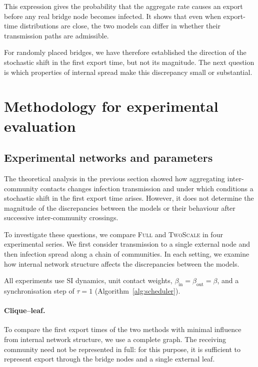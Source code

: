 \documentclass[a4paper,fleqn]{cas-sc}
\newcommand{\Full}{\textup{\textsc{Full}}}
\newcommand{\TS}{\textup{\textsc{TwoScale}}}
\begin{document}
This expression gives the probability that the aggregate rate causes an export before any real bridge node becomes infected. It shows that even when export-time distributions are close, the two models can differ in whether their transmission paths are admissible.

For randomly placed bridges, we have therefore established the direction of the stochastic shift in the first export time, but not its magnitude. The next question is which properties of internal spread make this discrepancy small or substantial.


\section{Methodology for experimental evaluation}
\label{sec:design}

\subsection{Experimental networks and parameters}

The theoretical analysis in the previous section showed how aggregating inter-community contacts changes infection transmission and under which conditions a stochastic shift in the first export time arises. However, it does not determine the magnitude of the discrepancies between the models or their behaviour after successive inter-community crossings.

To investigate these questions, we compare \Full{} and \TS{} in four experimental series. We first consider transmission to a single external node and then infection spread along a chain of communities. In each setting, we examine how internal network structure affects the discrepancies between the models.

All experiments use SI dynamics, unit contact weights, $\beta_{\mathrm{in}}=\beta_{\mathrm{out}}=\beta$, and a synchronisation step of $\tau=1$ (Algorithm~\ref{alg:scheduler}).

\paragraph{Clique--leaf.}
To compare the first export times of the two methods with minimal influence from internal network structure, we use a complete graph. The receiving community need not be represented in full: for this purpose, it is sufficient to represent export through the bridge nodes and a single external leaf.
\end{document}
